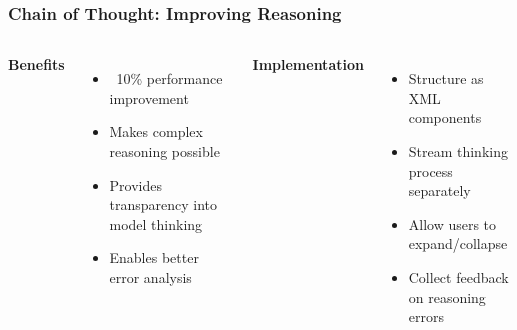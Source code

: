 \begin{frame}
    \frametitle{Chain of Thought: Improving Reasoning}
    
    \begin{columns}
        \textbf{Benefits}
        \begin{itemize}
            \item ~10\% performance improvement
            \item Makes complex reasoning possible
            \item Provides transparency into model thinking
            \item Enables better error analysis
        \end{itemize}
        
        \textbf{Implementation}
        \begin{itemize}
            \item Structure as XML components
            \item Stream thinking process separately
            \item Allow users to expand/collapse
            \item Collect feedback on reasoning errors
        \end{itemize}
    \end{columns}
    
    \begin{center}
    \end{center}
\end{frame}

